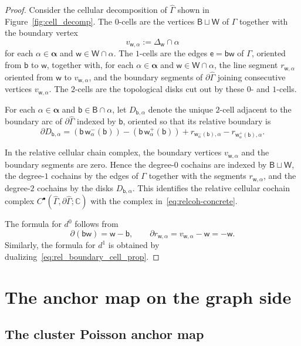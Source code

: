 \documentclass[dvipsnames,11pt]{article}
\theoremstyle{definition}
\newcommand{\C}{{\mathbb C}}
\def\B{\mathsf B}
\def\W{\mathsf W}
\def\w{\mathsf w}
\def\b{\mathsf b}
\def\e{\mathsf e}
\def\zz{\bm \alpha}
\begin{document}
\begin{proof}
Consider the cellular decomposition of \(\widehat\Gamma\) shown in Figure~\ref{fig:cell_decomp}. The \(0\)-cells are the vertices \(\B\sqcup \W\) of \(\Gamma\) together with the boundary vertex
\[
v_{\w,\alpha}:=\Delta_\w\cap \alpha
\]
for each \(\alpha\in\zz\) and \(\w\in \W\cap\alpha\). The \(1\)-cells are the edges \(\e=\b\w\) of \(\Gamma\), oriented from \(\b\) to \(\w\), together with, for each \(\alpha\in\zz\) and \(\w\in \W\cap\alpha\), the line segment \(r_{\w,\alpha}\) oriented from \(\w\) to \(v_{\w,\alpha}\), and the boundary segments of \(\partial\widehat\Gamma\) joining consecutive vertices \(v_{\w,\alpha}\). The \(2\)-cells are the topological disks cut out by these \(0\)- and \(1\)-cells.

For each \(\alpha\in\zz\) and \(\b\in \B\cap\alpha\), let \(D_{\b,\alpha}\) denote the unique \(2\)-cell adjacent to the boundary arc of \(\partial\widehat\Gamma\) indexed by \(\b\), oriented so that its relative boundary is
\begin{equation}\label{eq:rel_boundary_cell_prop}
\partial D_{\b,\alpha}
=
(\b\,\w_\alpha^{-}(\b))
-
(\b\,\w_\alpha^{+}(\b))
+
r_{\w_\alpha^{-}(\b),\alpha}
-
r_{\w_\alpha^{+}(\b),\alpha}.
\end{equation}

In the relative cellular chain complex, the boundary vertices \(v_{\w,\alpha}\) and the boundary segments are zero. Hence the degree-\(0\) cochains are indexed by \(\B\sqcup\W\), the degree-\(1\) cochains by the edges of \(\Gamma\) together with the segments \(r_{\w,\alpha}\), and the degree-\(2\) cochains by the disks \(D_{\b,\alpha}\). This identifies the relative cellular cochain complex \(C^\bullet(\widehat\Gamma,\partial\widehat\Gamma;\C)\) with the complex in~\eqref{eq:relcoh-concrete}.

The formula for \(d^0\) follows from
\[
\partial(\b\w)=\w-\b,
\qquad
\partial r_{\w,\alpha}=v_{\w,\alpha}-\w = -\w.
\]
Similarly, the formula for \(d^1\) is obtained by dualizing~\eqref{eq:rel_boundary_cell_prop}.
\end{proof}

\section{The anchor map on the graph side}\label{sec:anchor_cps}

\subsection{The cluster Poisson anchor map}
\end{document}
